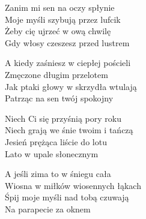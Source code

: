
\begin{text}
    Zanim mi sen na oczy spłynie\\
    Moje myśli szybują przez lufcik\\
    Żeby cię ujrzeć w ową chwilę\\
    Gdy włosy czeszesz przed lustrem

    A kiedy zaśniesz w ciepłej pościeli\\
    Zmęczone długim przelotem\\
    Jak ptaki głowy w skrzydła wtulają\\
    Patrząc na sen twój spokojny

    Niech Ci się przyśnią pory roku\\
    Niech grają we śnie twoim i tańczą\\
    Jesień prężąca liście do lotu\\
    Lato w upale słonecznym

    A jeśli zima to w śniegu cała\\
    Wiosna w miłków wiosennych łąkach\\
    Śpij moje myśli nad tobą czuwają\\
    Na parapecie za oknem
\end{text}
\begin{chord}

\end{chord}